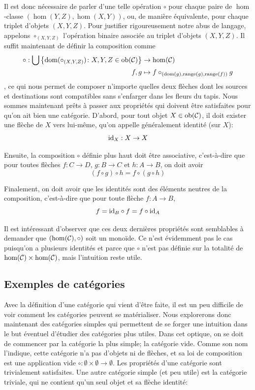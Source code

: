 Il est donc nécessaire de parler d'une telle opération $\circ$ pour chaque
paire de $\hom$-classe $\left(\hom(Y, Z), \hom(X, Y)\right)$, ou, de manière
équivalente, pour chaque triplet d'objets $\left(X, Y, Z\right)$. Pour justifier
rigoureusement notre abus de langage, appelons $\circ_{\left(X,Y,Z\right)}$
l'opération binaire associée au triplet d'objets $\left(X,Y,Z\right)$.
Il suffit maintenant de définir la composition comme
\begin{align*}
    \circ : \bigcup \left\{ \mathrm{dom}(\circ_{\left(X,Y,Z\right)})
                            \colon X, Y, Z \in \mathrm{ob}(\mathcal{C}) \right\} &\to \hom(\mathcal{C}) \\
           f, g &\mapsto f \circ_{\left(\mathrm{dom}(g), \mathrm{range}(g), \mathrm{range}(f)\right)} g
\end{align*}
, ce qui nous permet de composer n'importe quelles deux flèches dont les sources
et destinations sont compatibles sans s'enfarger dans les fleurs du tapis. Nous
sommes maintenant prêts à passer aux propriétés qui doivent être satisfaites
pour qu'on ait bien une catégorie. D'abord, pour tout objet $X \in \mathrm{ob}(\mathcal{C})$,
il doit exister une flèche de $X$ vers lui-même, qu'on appelle généralement
identité (sur $X$):
\[
    \mathrm{id}_X : X \to X
\]

Ensuite, la composition $\circ$ définie plus haut doit être associative,
c'est-à-dire que pour toutes flèches $f : C \to D$, $g : B \to C$ et
$h : A \to B$, on doit avoir
\[
    (f \circ g) \circ h = f \circ (g \circ h)
\]

Finalement, on doit avoir que les identités sont des éléments neutres de la
composition, c'est-à-dire que pour toute flèche $f : A \to B$,
\[
    f = \mathrm{id}_B \circ f = f \circ \mathrm{id}_A
\]

Il est intéressant d'observer que ces deux dernières propriétés sont
semblables à demander que $\left(\hom(\mathcal{C}), \circ\right)$ soit un monoïde.
Ce n'est évidemment pas le cas puisqu'on a plusieurs identités et parce
que $\circ$ n'est pas définie sur la totalité de $\hom(\mathcal{C}) \times \hom(\mathcal{C})$,
mais l'intuition reste utile.


\subsection{Exemples de catégories}
Avec la définition d'une catégorie qui vient d'être faite, il est un peu
difficile de voir comment les catégories peuvent se matérialiser. Nous
explorerons donc maintenant des catégories simples qui permettent de se
forger une intuition dans le but éventuel d'étudier des catégories plus utiles.
Dans cet optique, on se doit de commencer par la catégorie la plus simple;
la catégorie vide. Comme son nom l'indique, cette catégorie n'a pas d'objets
ni de flèches, et sa loi de composition est une application vide
$\circ : \emptyset \times \emptyset \to \emptyset$. Les propriétés d'une
catégorie sont trivialement satisfaites. Une autre catégorie simple (et
peu utile) est la catégorie triviale, qui ne contient qu'un seul objet
et sa flèche identité:


